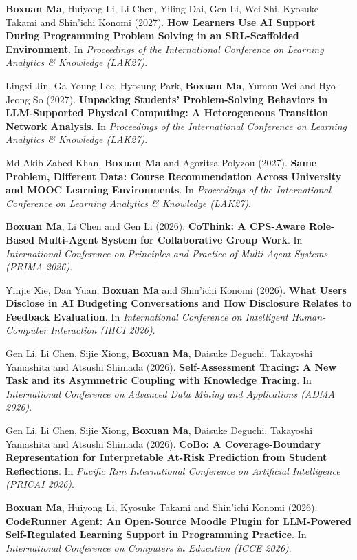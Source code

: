 \documentclass[a4paper,11pt]{article}
\begin{document}
\item[\textbf{[C.55]}] \textbf{Boxuan Ma}, Huiyong Li, Li Chen, Yiling Dai, Gen Li, Wei Shi, Kyosuke Takami and Shin'ichi Konomi (2027). \textbf{How Learners Use AI Support During Programming Problem Solving in an SRL-Scaffolded Environment}. In \textit{Proceedings of the International Conference on Learning Analytics \& Knowledge (LAK27)}.
\item[\textbf{[C.54]}] Lingxi Jin, Ga Young Lee, Hyosung Park, \textbf{Boxuan Ma}, Yumou Wei and Hyo-Jeong So (2027). \textbf{Unpacking Students' Problem-Solving Behaviors in LLM-Supported Physical Computing: A Heterogeneous Transition Network Analysis}. In \textit{Proceedings of the International Conference on Learning Analytics \& Knowledge (LAK27)}.
\item[\textbf{[C.53]}] Md Akib Zabed Khan, \textbf{Boxuan Ma} and Agoritsa Polyzou (2027). \textbf{Same Problem, Different Data: Course Recommendation Across University and MOOC Learning Environments}. In \textit{Proceedings of the International Conference on Learning Analytics \& Knowledge (LAK27)}.
\item[\textbf{[C.52]}] \textbf{Boxuan Ma}, Li Chen and Gen Li (2026). \textbf{CoThink: A CPS-Aware Role-Based Multi-Agent System for Collaborative Group Work}. In \textit{International Conference on Principles and Practice of Multi-Agent Systems (PRIMA 2026)}.
\item[\textbf{[C.51]}] Yinjie Xie, Dan Yuan, \textbf{Boxuan Ma} and Shin'ichi Konomi (2026). \textbf{What Users Disclose in AI Budgeting Conversations and How Disclosure Relates to Feedback Evaluation}. In \textit{International Conference on Intelligent Human-Computer Interaction (IHCI 2026)}.
\item[\textbf{[C.50]}] Gen Li, Li Chen, Sijie Xiong, \textbf{Boxuan Ma}, Daisuke Deguchi, Takayoshi Yamashita and Atsushi Shimada (2026). \textbf{Self-Assessment Tracing: A New Task and its Asymmetric Coupling with Knowledge Tracing}. In \textit{International Conference on Advanced Data Mining and Applications (ADMA 2026)}.
\item[\textbf{[C.49]}] Gen Li, Li Chen, Sijie Xiong, \textbf{Boxuan Ma}, Daisuke Deguchi, Takayoshi Yamashita and Atsushi Shimada (2026). \textbf{CoBo: A Coverage-Boundary Representation for Interpretable At-Risk Prediction from Student Reflections}. In \textit{Pacific Rim International Conference on Artificial Intelligence (PRICAI 2026)}.
\item[\textbf{[C.48]}] \textbf{Boxuan Ma}, Huiyong Li, Kyosuke Takami and Shin'ichi Konomi (2026). \textbf{CodeRunner Agent: An Open-Source Moodle Plugin for LLM-Powered Self-Regulated Learning Support in Programming Practice}. In \textit{International Conference on Computers in Education (ICCE 2026)}.
\end{document}
